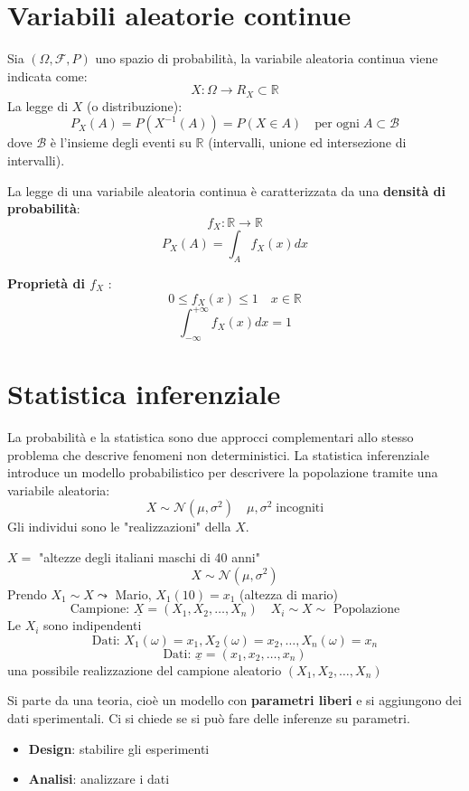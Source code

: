\documentclass[a4paper]{article}
\theoremstyle{break}
\theoremstyle{break}
\theoremstyle{break}
\theoremstyle{break}
\begin{document}
\section{Variabili aleatorie continue}
Sia \( (\Omega, \mathcal{F}, P) \) uno spazio di probabilità, la variabile aleatoria
continua viene indicata come:
\[
X: \Omega \to R_X \subset \mathbb{R}
\] 
La legge di \( X \) (o distribuzione):
\[
  P_X(A) = P(X^{-1}(A)) = P(X \in A) \quad \text{per ogni} \; A \subset \mathcal{B}
\] 
dove \( \mathcal{B} \) è l'insieme degli eventi su \( \mathbb{R} \) (intervalli, unione
ed intersezione di intervalli).

\vspace{1em}
\noindent La legge di una variabile aleatoria continua è caratterizzata da una
\textbf{densità di probabilità}:
\[
f_X: \mathbb{R} \to \mathbb{R}
\] 
\[
P_X(A) = \int_A f_X(x)dx
\] 

\textbf{Proprietà di \( f_X \) }:
\[
0 \le f_X(x) \le 1 \quad x \in \mathbb{R}
\] 
\[
\int_{-\infty}^{+\infty} f_X(x)dx = 1
\] 

\section{Statistica inferenziale}
La probabilità e la statistica sono due approcci complementari allo stesso problema che
descrive fenomeni non deterministici. La statistica inferenziale introduce un modello
probabilistico per descrivere la popolazione tramite una variabile aleatoria:
\[
X \sim \mathcal{N}(\mu, \sigma^2) \quad \mu, \sigma^2 \; \text{incogniti}
\] 
Gli individui sono le "realizzazioni" della \( X \).

\begin{example}
  \( X =\) "altezze degli italiani maschi di 40 anni"
  \[
  X \sim \mathcal{N}(\mu, \sigma^2)
  \] 
  Prendo \( X_1 \sim X \leadsto\) Mario, \( X_1(10) = x_1 \) (altezza di mario)
  \[
    \text{Campione: } \underline{X} = (X_1, X_2, \ldots, X_n) \quad X_i \sim X \sim \text{ Popolazione}
  \] 
  Le \( X_i \) sono indipendenti
  \[
  \text{Dati: } X_1(\omega) = x_1, X_2(\omega) = x_2, \ldots, X_n(\omega) = x_n
  \] 
  \[
    \text{Dati: } \underline{x} = (x_1, x_2, \ldots, x_n)
  \] 
  una possibile realizzazione del campione aleatorio \( (X_1, X_2, \ldots, X_n) \)
\end{example}

Si parte da una teoria, cioè un modello con \textbf{parametri liberi} e si aggiungono dei
dati sperimentali. Ci si chiede se si può fare delle inferenze su parametri.
\begin{itemize}
  \item \textbf{Design}: stabilire gli esperimenti
  \item \textbf{Analisi}: analizzare i dati
\end{itemize}
\end{document}
